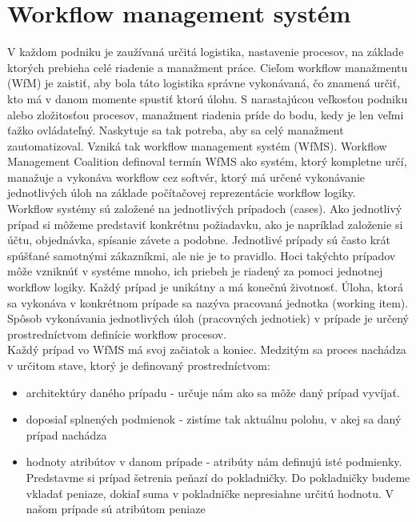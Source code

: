 
\section{Workflow management systém}
V každom podniku je zaužívaná určitá logistika, nastavenie procesov, na základe ktorých prebieha celé riadenie a manažment práce. Cieľom workflow manažmentu (WfM) je zaistiť, aby bola táto logistika správne vykonávaná, čo znamená určiť, kto má v danom momente spustiť ktorú úlohu. S narastajúcou veľkosťou podniku alebo zložitosťou procesov, manažment riadenia príde do bodu, kedy je len veľmi ťažko ovládateľný. Naskytuje sa tak potreba, aby sa celý manažment zautomatizoval. Vzniká tak workflow management systém (WfMS). Workflow Management Coalition definoval termín WfMS ako systém, ktorý kompletne určí, manažuje a vykonáva workflow cez softvér, ktorý má určené vykonávanie jednotlivých úloh na základe počítačovej reprezentácie workflow logiky. \cite{aalst}\\



Workflow systémy sú založené na jednotlivých prípadoch (cases). Ako jednotlivý prípad si môžeme predstaviť konkrétnu požiadavku, ako je napríklad založenie si účtu, objednávka, spísanie závete a podobne. Jednotlivé prípady sú často krát spúšťané samotnými zákazníkmi, ale nie je to pravidlo. Hoci takýchto prípadov môže vzniknúť v systéme mnoho, ich priebeh je riadený za pomoci jednotnej workflow logiky. Každý prípad je unikátny a má konečnú životnosť.  Úloha, ktorá sa vykonáva v konkrétnom prípade sa nazýva pracovaná jednotka (working item).
Spôsob vykonávania jednotlivých úloh (pracovných jednotiek) v prípade  je určený prostredníctvom definície workflow procesov. \cite{aalst}  \\	 



Každý prípad vo WfMS má svoj začiatok a koniec. Medzitým sa proces nachádza v určitom stave, ktorý je definovaný prostredníctvom:
\begin{itemize}
	\item architektúry daného prípadu - určuje nám ako sa môže daný prípad vyvíjať. 
	\item doposiaľ splnených podmienok - zistíme tak aktuálnu \glqq polohu\grqq, v akej sa daný prípad nachádza 
	\item hodnoty atribútov v danom prípade - atribúty nám definujú isté podmienky. Predstavme si prípad šetrenia peňazí do pokladničky. Do pokladničky budeme vkladať peniaze, dokiaľ suma v pokladničke nepresiahne určitú hodnotu. V našom prípade sú atribútom peniaze
\end{itemize}

